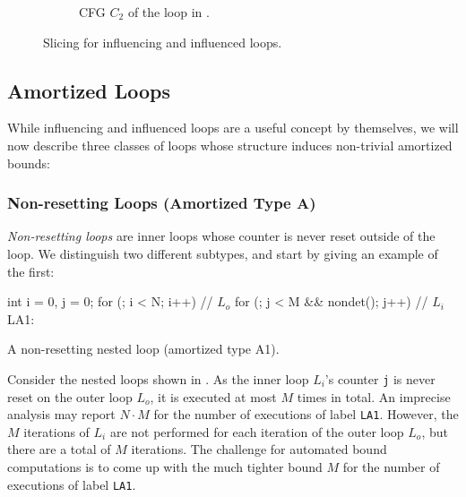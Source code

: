 \begin{figure}
\begin{subfigure}{.48\linewidth}
        \caption{CFG $C_2$ of the loop in .}
        \label{fig:deps_cfg}
    \end{subfigure}
    \caption{Slicing for influencing and influenced loops.}
    \label{fig:infl_cfg}
\end{figure}

\subsection{Amortized Loops}

While influencing and influenced loops are a useful concept by themselves, we will now describe three classes of loops whose structure induces non-trivial amortized bounds:

\subsubsection{Non-resetting Loops (Amortized Type A)}

\emph{Non-resetting loops} are inner loops whose counter is never reset outside of the loop. We distinguish two different subtypes, and start by giving an example of the first:

\begin{listing}
\begin{ccode}
int i = 0,
    j = 0;
for (; i < N; i++) {                  // $L_o$
    for (; j < M && nondet(); j++) {  // $L_i$
LA1:
    }
}
\end{ccode}
\caption{A non-resetting nested loop (amortized type A1).}
\label{lst:amorta1}
\end{listing}

\begin{example}
Consider the nested loops shown in . As the inner loop $L_i$'s counter \texttt{j} is never reset on the outer loop $L_o$, it is executed at most $M$ times in total. An imprecise analysis may report $N \cdot M$ for the number of executions of label \texttt{LA1}. However, the $M$ iterations of $L_i$ are not performed for each iteration of the outer loop $L_o$, but there are a total of $M$ iterations. The challenge for automated bound computations is to come up with the much tighter bound $M$ for the number of executions of label \texttt{LA1}.
\end{example}

